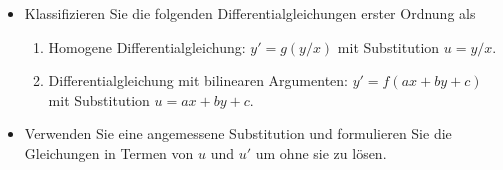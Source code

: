 {
\begin{itemize}
\item[\textbf{1)}] Klassifizieren Sie die folgenden Differentialgleichungen erster 
Ordnung als 
\begin{enumerate}
\item Homogene Differentialgleichung: $y'=g(y/x)$ mit Substitution $u=y/x$.
\item Differentialgleichung mit bilinearen Argumenten: $y'=f(ax+by+c)$ mit Substitution $u=ax+by+c$.
\end{enumerate}
\begin{multicols}{2}
\end{multicols}
\item[\textbf{2)}]  
Verwenden Sie eine angemessene Substitution und formulieren Sie die Gleichungen in Termen
von $u$ und $u'$ um ohne sie zu lösen.
\end{itemize}
}


